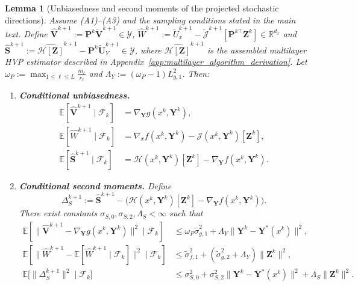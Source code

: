 \documentclass{pkumelon}
\theoremstyle{plain}
\newtheorem{lemma}{Lemma}
\newcommand{\R}{\mathbb{R}}
\newcommand{\E}{\mathbb{E}}
\begin{document}
\begin{lemma}[Unbiasedness and second moments of the projected stochastic directions]\label{lem:unbiased_lifted_oracles}
Assume \emph{(A1)}--\emph{(A3)} and the sampling conditions stated in the main text. Define $\widehat{\boldsymbol V}^{k+1}:=\boldsymbol P^k\tilde{\boldsymbol V}^{k+1}\in\mathcal Y$, $\widehat W^{k+1}:=\tilde U_x^{k+1}-\tilde{\mathcal J}^{k+1}[\boldsymbol P^{k\top}\boldsymbol Z^k]\in\R^{d_x}$ and $\widehat{\boldsymbol S}^{k+1}:=\widehat{\mathcal H[\boldsymbol Z]}^{k+1}-\boldsymbol P^k\tilde{\boldsymbol U}_Y^{k+1}\in\mathcal Y$, where $\widehat{\mathcal H[\boldsymbol Z]}^{k+1}$ is the assembled multilayer HVP estimator described in Appendix~\ref{app:multilayer_algorithm_derivation}. Let $\omega_P:=\max_{1\le \ell\le L}\frac{m_\ell}{r_\ell}$ and $\Lambda_Y:=(\omega_P-1)L_{g,1}^2$. Then:
\begin{enumerate}
\item[(i)] \textbf{Conditional unbiasedness.}
\begin{equation*}
\begin{aligned}
\E[\widehat{\boldsymbol V}^{k+1}\mid\mathcal F_k]&=\nabla_{\boldsymbol Y}g(x^k,\boldsymbol Y^k),\\
\E[\widehat W^{k+1}\mid\mathcal F_k] &=\nabla_x f(x^k,\boldsymbol Y^k)-\mathcal J(x^k,\boldsymbol Y^k)[\boldsymbol Z^k],\\
\E[\widehat{\boldsymbol S}^{k+1}\mid\mathcal F_k] &=\mathcal H(x^k,\boldsymbol Y^k)[\boldsymbol Z^k]-\nabla_{\boldsymbol Y}f(x^k,\boldsymbol Y^k).
\end{aligned}
\end{equation*}
\item[(ii)] \textbf{Conditional second moments.}
Define
\begin{equation*}
\Delta_S^{k+1} := \widehat{\boldsymbol S}^{k+1} -\bigl(\mathcal H(x^k,\boldsymbol Y^k)[\boldsymbol Z^k] -\nabla_{\boldsymbol Y}f(x^k,\boldsymbol Y^k)\bigr).
\end{equation*}
There exist constants $\sigma_{S,0},\sigma_{S,2},\Lambda_S<\infty$ such that
\begin{subequations}\label{eq:lifted_oracle_second_moments}
\begin{align}
\E[\|\widehat{\boldsymbol V}^{k+1}-\nabla_{\boldsymbol Y}g(x^k,\boldsymbol Y^k)\|^2\mid\mathcal F_k]
&\le \omega_P\tilde\sigma_{g,1}^2+\Lambda_Y\|\boldsymbol Y^k-\boldsymbol Y^*(x^k)\|^2, \label{eq:V_hat_var_matrix}\\
\E[\|\widehat W^{k+1}-\E[\widehat W^{k+1}\mid\mathcal F_k]\|^2\mid\mathcal F_k]
&\le \tilde\sigma_{f,1}^2+(\tilde\sigma_{g,2}^2+\Lambda_Y)\|\boldsymbol Z^k\|^2, \label{eq:W_hat_var_matrix}\\
\E\!\bigl[\|\Delta_S^{k+1}\|^2 \mid \mathcal F_k \bigr]
&\le \sigma_{S,0}^2 +\sigma_{S,2}^2\|\boldsymbol Y^k-\boldsymbol Y^*(x^k)\|^2+\Lambda_S\|\boldsymbol Z^k\|^2. \label{eq:S_hat_var_matrix}
\end{align}
\end{subequations}
\end{enumerate}
\end{lemma}
\end{document}

